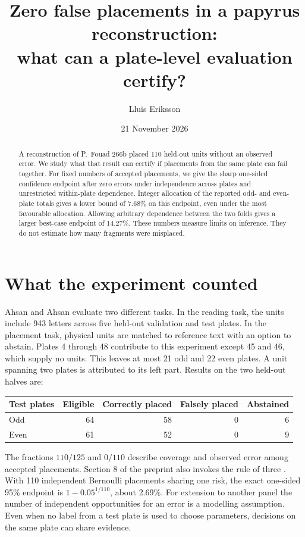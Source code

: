 \documentclass[11pt]{article}
\title{Zero false placements in a papyrus reconstruction:\\what can a plate-level evaluation certify?}
\author{Lluis Eriksson}\date{21 November 2026}
\begin{document}
\maketitle
\begin{abstract}
A reconstruction of P.\ Fouad 266b placed 110 held-out units without an observed error. We study what that result can certify if placements from the same plate can fail together. For fixed numbers of accepted placements, we give the sharp one-sided confidence endpoint after zero errors under independence across plates and unrestricted within-plate dependence. Integer allocation of the reported odd- and even-plate totals gives a lower bound of 7.68\% on this endpoint, even under the most favourable allocation. Allowing arbitrary dependence between the two folds gives a larger best-case endpoint of 14.27\%. These numbers measure limits on inference. They do not estimate how many fragments were misplaced.
\end{abstract}
\section{What the experiment counted}
Ahsan and Ahsan \cite{aa} evaluate two different tasks. In the reading task, the units include 943 letters across five held-out validation and test plates. In the placement task, physical units are matched to reference text with an option to abstain. Plates 4 through 48 contribute to this experiment except 45 and 46, which supply no units. This leaves at most 21 odd and 22 even plates. A unit spanning two plates is attributed to its left part. Results on the two held-out halves are:
\begin{center}
\begin{tabular}{lrrrr}\toprule
Test plates & Eligible & Correctly placed & Falsely placed & Abstained\\\midrule
Odd &64&58&0&6\\
Even &61&52&0&9\\\bottomrule
\end{tabular}
\end{center}
The fractions $110/125$ and $0/110$ describe coverage and observed error among accepted placements. Section 8 of the preprint also invokes the rule of three \cite{hanley}. With 110 independent Bernoulli placements sharing one risk, the exact one-sided 95\% endpoint is $1-0.05^{1/110}$, about 2.69\%. For extension to another panel the number of independent opportunities for an error is a modelling assumption. Even when no label from a test plate is used to choose parameters, decisions on the same plate can share evidence.
\newpage
\end{document}
